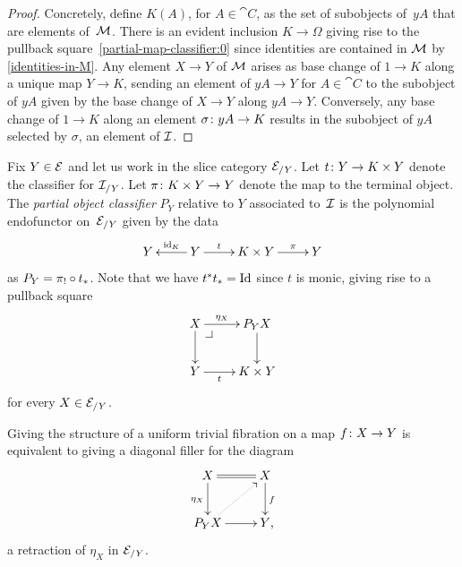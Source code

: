 \documentclass[reqno,10pt,a4paper,oneside,draft]{amsart}
\begin{document}
{{\begin{proof}
Concretely, define $K(A)$, for $A \in \cat{C}$, as the set of subobjects of~$y A$ that are elements of~$\cal{M}$.
There is an evident inclusion $K \to \Omega$ giving rise to the pullback square~\eqref{partial-map-classifier:0} since identities are contained in $\cal{M}$ by \cref{identities-in-M}.
Any element $X \to Y$ of $\cal{M}$ arises as base change of $1 \to K$ along a unique map $Y \to K$, sending an element of $y A \to Y$ for $A \in \cat{C}$ to the subobject of $y A$ given by the base change of $X \to Y$ along $y A \to Y$.
Conversely, any base change of $1 \to K$ along an element $\sigma \co y A \to K$ results in the subobject of $y A$ selected by $\sigma$, an element of $\cal{I}$.
\end{proof} 

Fix $Y \in \cal{E}$ and let us work in the slice category $\cal{E}_{/Y}$.
Let $t \co Y \to K \times Y$ denote the classifier for $\cal{I}_{/Y}$.
Let $\pi \co K \times Y \to Y$ denote the map to the terminal object.
The \emph{partial object classifier} $P_Y$ relative to $Y$ associated to~$\cal{I}$ is the polynomial endofunctor on~$\cal{E}_{/Y}$ given by the data
\[
\xymatrix{
  Y
&
  Y
  \ar[l]_-{\id_K}
  \ar[r]^-{t}
&
  K \times Y
  \ar[r]^-{\pi}
&
  Y
}
\]
as $P_Y = \pi_! \cc t_*$.
Note that we have $t^* t_* = \Id$ since $t$ is monic, giving rise to a pullback square
\begin{equation} \label{partial-map-classifier:1}
\begin{gathered}
\xymatrix{
  X
  \ar[r]^-{\eta_X}
  \ar[d]
  \pullback{dr}
&
  P_Y X
  \ar[d]
\\
  Y
  \ar[r]_-{t}
&
  K \times Y
}
\end{gathered}
\end{equation}
for every $X \in \cal{E}_{/Y}$.


\begin{theorem} Giving the structure of a uniform trivial fibration on a map $f \co X \to Y$ is equivalent to giving a diagonal filler for the diagram
\begin{equation*}
\begin{gathered}
\xymatrix{
  X
  \ar@{=}[r]
  \ar[d]_{\eta_X}
&
  X
  \ar[d]^{f}
\\
  P_Y X
  \ar[r]
  \ar@{.>}[ur]
&
  Y
\rlap{,}}
\end{gathered}
\end{equation*}
\ie a retraction of $\eta_X$ in $\cal{E}_{/Y}$.
\end{theorem}

}}
\end{document}
